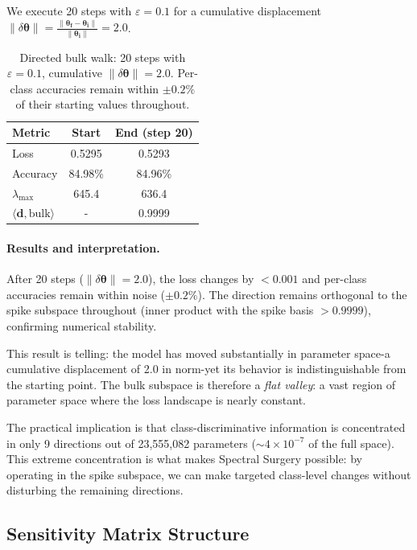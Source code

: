 \documentclass[11pt,a4paper]{article}
\newcommand{\norm}[1]{\lVert #1 \rVert}
\newcommand{\vect}[1]{\bm{#1}}
\begin{document}
We execute 20 steps with $\varepsilon = 0.1$ for a cumulative
displacement $\norm{\delta\vect{\theta}} = \frac{\norm{\vect{\theta_f} -
\vect{\theta_i}}}{\vect{{\norm{\theta_i}}}} = 2.0$.

\begin{table}[ht]
\centering
\caption{Directed bulk walk: 20 steps with $\varepsilon = 0.1$,
cumulative $\norm{\delta\vect{\theta}} = 2.0$. Per-class accuracies
remain within $\pm 0.2\%$ of their starting values throughout.}
\label{tab:bulk-walk}
\begin{tabular}{lcc}
\toprule
Metric & Start & End (step 20) \\
\midrule
Loss & 0.5295 & 0.5293 \\
Accuracy & 84.98\% & 84.96\% \\
$\lambda_{\max}$ & 645.4 & 636.4 \\
$\langle \vect{d}, \mathrm{bulk}\rangle$ & - & 0.9999 \\
\bottomrule
\end{tabular}
\end{table}

\paragraph{Results and interpretation.}
After 20 steps ($\norm{\delta\vect{\theta}} = 2.0$), the loss changes
by $< 0.001$ and per-class accuracies remain within noise
($\pm 0.2\%$). The direction remains orthogonal to the spike subspace
throughout (inner product with the spike basis $> 0.9999$), confirming
numerical stability.

This result is telling: the model has moved substantially in parameter
space-a cumulative displacement of 2.0 in norm-yet its behavior is
indistinguishable from the starting point. The bulk subspace is
therefore a \emph{flat valley}: a vast region of parameter space where
the loss landscape is nearly constant.

The practical implication is that class-discriminative information is
concentrated in only 9 directions out of 23,555,082 parameters
(${\sim}4 \times 10^{-7}$ of the full space). This extreme
concentration is what makes Spectral Surgery possible: by operating in
the spike subspace, we can make targeted class-level changes without
disturbing the remaining directions.


\subsection{Sensitivity Matrix Structure}
\end{document}
